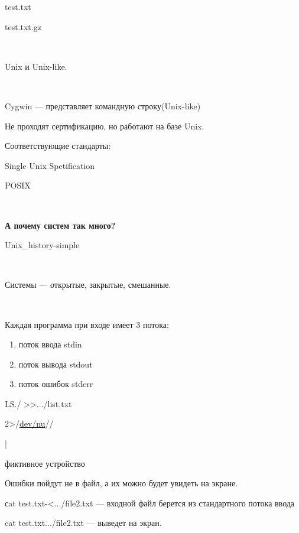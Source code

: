 \par  test.txt
\par  test.txt.gz
\par \\

\par Unix и
Unix-like.
\par \\

\par Cygwin —
представляет командную строку(Unix-like)
\par Не
проходят сертификацию, но работают на
базе Unix.
\par Соответствующие
стандарты:
\par Single Unix
Spetification
\par POSIX
\par \\

\par \textbf{А почему
систем так много?}
\par Unix\_history-simple
\par \\

\par Системы
— открытые, закрытые, смешанные.
\par \\

\par Каждая
программа при входе имеет 3 потока:
\begin{enumerate}
	\item \par поток
	ввода		stdin
	\item \par поток
	вывода 	stdout
	\item \par поток
	ошибок	stderr
\end{enumerate}
\par LS./
>>.../list.txt
\par  2>/\underline{dev/nu}//

\par         |
\par    фиктивное
устройство
\par Ошибки
пойдут не в файл, а их можно будет увидеть
на экране.
\par  сat
test.txt-<.../file2.txt — входной файл берется
из стандартного потока ввода
\par  cat
test.txt.../file2.txt — выведет на экран.
\par  

